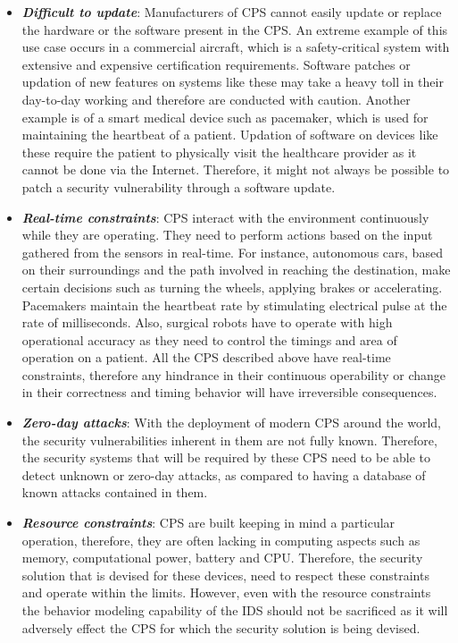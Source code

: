 \begin{itemize}
\item  \textbf{\textit{Difficult to update}}: Manufacturers of \ac{CPS} cannot easily update or replace the hardware or the software present in the \ac{CPS}. An extreme example of this use case occurs in a commercial aircraft, which is a safety-critical system with extensive and expensive certification requirements. Software patches or updation of new features on systems like these may take a heavy toll in their day-to-day working and therefore are conducted with caution. Another example is of a smart medical device such as pacemaker, which is used for maintaining the heartbeat of a patient. Updation of software on devices like these require the patient to physically visit the healthcare provider as it cannot be done via the Internet. Therefore, it might not always be possible to patch a security vulnerability through a software update.

\item \textbf{\textit{Real-time constraints}}: \ac{CPS} interact with the environment continuously while they are operating. They need to perform actions based on the input gathered from the sensors in real-time. For instance, autonomous cars, based on their surroundings and the path involved in reaching the destination, make certain decisions such as turning the wheels, applying brakes or accelerating. Pacemakers maintain the heartbeat rate by stimulating electrical pulse at the rate of milliseconds. Also, surgical robots have to operate with high operational accuracy as they need to control the timings and area of operation on a patient. All the \ac{CPS} described above have real-time constraints, therefore any hindrance in their continuous operability or change in their correctness and timing behavior will have irreversible consequences.

\item \textbf{\textit{Zero-day attacks}}: With the deployment of modern \ac{CPS} around the world, the security vulnerabilities inherent in them are not fully known. Therefore, the security systems that will be required by these \ac{CPS} need to be able to detect unknown or zero-day attacks, as compared to having a database of known attacks contained in them.

\item \textbf{\textit{Resource constraints}}: \ac{CPS} are built keeping in mind a particular operation, therefore, they are often lacking in computing aspects such as memory, computational power, battery and CPU. Therefore, the security solution that is devised for these devices, need to respect these constraints and operate within the limits. However, even with the resource constraints the behavior modeling capability of the \ac{IDS} should not be sacrificed as it will adversely effect the \ac{CPS} for which the security solution is being devised.


\end{itemize}
